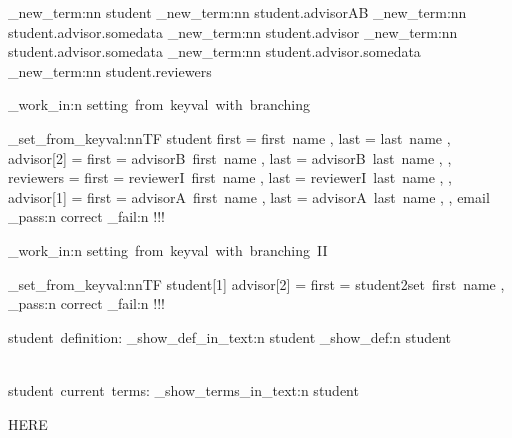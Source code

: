 \documentclass{article}
\begin{document}
        \starray_new_term:nn {student}{}
        \starray_new_term:nn {student.advisor}{AB}
        \starray_new_term:nn {student.advisor.somedata}{}
        \starray_new_term:nn {student.advisor}{}
        \starray_new_term:nn {student.advisor.somedata}{}
        \starray_new_term:nn {student.advisor.somedata}{}
        \starray_new_term:nn {student.reviewers}{}



\sttests_work_in:n {setting~from~keyval~with~branching}

      \starray_set_from_keyval:nnTF
        {student}
        {
          first = first~name ,
          last = last~name ,
          advisor[2] = {
            first = advisorB~first~name ,
            last  = advisorB~last~name ,
          } ,
          reviewers = {
            first = reviewerI~first~name ,
            last  = reviewerI~last~name ,
          } ,
          advisor[1] = {
            first = advisorA~first~name ,
            last  = advisorA~last~name ,
          } ,
          email
        }
        {\sttests_pass:n {correct}}
        {\sttests_fail:n {!!!}}

\sttests_work_in:n {setting~from~keyval~with~branching~II}

      \starray_set_from_keyval:nnTF
        {student[1]}
        {
          advisor[2] = {
            first = student2set~first~name ,
            }
        }
        {\sttests_pass:n {correct}}
        {\sttests_fail:n {!!!}}

\par
student~definition:
\starray_show_def_in_text:n {student}
\starray_show_def:n {student}

\\[2\baselineskip]
student~current~terms:
\starray_show_terms_in_text:n {student}

\par HERE\par











\ExplSyntaxOff
\end{document}
